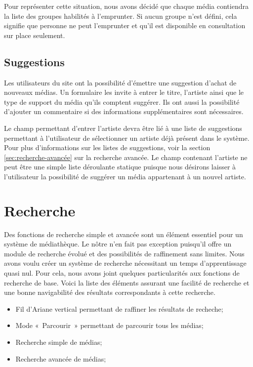 \documentclass[letter, 11pt]{report}
\begin{document}
Pour représenter cette situation, nous avons décidé que chaque média contiendra la liste des groupes habilités à l'emprunter. Si aucun groupe n'est défini, cela signifie que personne ne peut l'emprunter et qu'il est disponible en consultation sur place seulement.

\subsection{Suggestions}
Les utilisateurs du site ont la possibilité d'émettre une suggestion d'achat de nouveaux médias. Un formulaire les invite à entrer le titre, l'artiste ainsi que le type de support du média qu'ils comptent suggérer. Ils ont aussi la possibilité d'ajouter un commentaire si des informations supplémentaires sont nécessaires.

Le champ permettant d'entrer l'artiste devra être lié à une liste de suggestions permettant à l'utilisateur de sélectionner un artiste déjà présent dans le système. Pour plus d'informations sur les listes de suggestions, voir la section \ref{sec:recherche-avancée} sur la recherche avancée. Le champ contenant l'artiste ne peut être une simple liste déroulante statique puisque nous désirons laisser à l'utilisateur la possibilité de suggérer un média appartenant à un nouvel artiste.

\section{Recherche}

Des fonctions de recherche simple et avancée sont un élément essentiel pour un système de médiathèque. Le nôtre n'en fait pas exception puisqu'il offre un module de recherche évolué et des possibilités de raffinement sans limites. Nous avons voulu créer un système de recherche nécessitant un temps d'apprentissage quasi nul. Pour cela, nous avons joint quelques particularités aux fonctions de recherche de base. Voici la liste des éléments assurant une facilité de recherche et une bonne navigabilité des résultats correspondants à cette recherche.

\begin{itemize}
	\item Fil d'Ariane vertical permettant de raffiner les résultats de recheche;
	\item Mode «~Parcourir~» permettant de parcourir tous les médias;
	\item Recherche simple de médias;
	\item Recherche avancée de médias;
\end{itemize}
\end{document}
